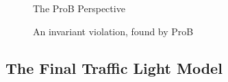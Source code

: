 \begin{figure}[!ht]
\begin{center}
	\caption{The ProB Perspective}
	\label{fig_tut_prob_perspective}
\end{center}
\end{figure}

\begin{figure}[!ht]
\begin{center}
	\caption{An invariant violation, found by ProB}
	\label{tut_03_prob_invariant_violation}
\end{center}
\end{figure}


\subsection{The Final Traffic Light Model}
\label{tut_final_model}

